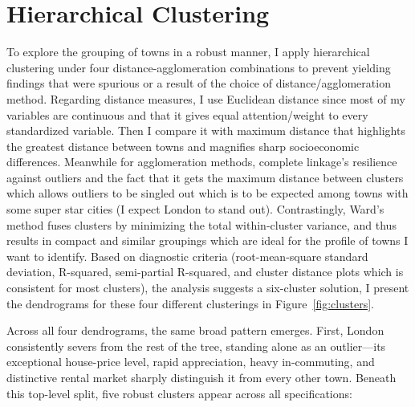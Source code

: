 \documentclass[12pt]{article}
\begin{document}
\section{Hierarchical Clustering}
To explore the grouping of towns in a robust manner, I apply hierarchical clustering under four distance-agglomeration combinations to prevent yielding findings that were spurious or a result of the choice of distance/agglomeration method. Regarding distance measures, I use Euclidean distance since most of my variables are continuous and that it gives equal attention/weight to every standardized variable. Then I compare it with maximum distance that highlights the greatest distance between towns and magnifies sharp socioeconomic differences. Meanwhile for agglomeration methods, complete linkage's resilience against outliers and the fact that it gets the maximum distance between clusters which allows outliers to be singled out which is to be expected among towns with some super star cities (I expect London to stand out). Contrastingly, Ward's method fuses clusters by minimizing the total within-cluster variance, and thus results in compact and similar groupings which are ideal for the profile of towns I want to identify. Based on diagnostic criteria (root-mean-square standard deviation, R-squared, semi-partial R-squared, and cluster distance plots which is consistent for most clusters), the analysis suggests a six-cluster solution, I present the dendrograms for these four different clusterings in Figure~\ref{fig:clusters}.

\begin{sidewaysfigure}
  \centering
  \caption{Dendrograms under Different Specifications}
  \label{fig:clusters}
\end{sidewaysfigure}

Across all four dendrograms, the same broad pattern emerges. First, London consistently severs from the rest of the tree, standing alone as an outlier—its exceptional house-price level, rapid appreciation, heavy in-commuting, and distinctive rental market sharply distinguish it from every other town. Beneath this top-level split, five robust clusters appear across all specifications: 
\end{document}
